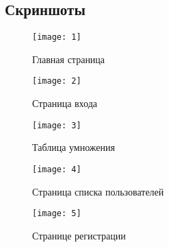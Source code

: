\documentclass[a4paper]{article}
\begin{document}
\pagebreak

\subsection{Скриншоты}

\begin{figure}[h]
\texttt{[image: 1]}
\caption{Главная страница}
\end{figure}

\begin{figure}[h]
\texttt{[image: 2]}
\caption{Страница входа}
\end{figure}

\begin{figure}[h]
\texttt{[image: 3]}
\caption{Таблица умножения}
\end{figure}

\begin{figure}[h]
\texttt{[image: 4]}
\caption{Страница списка пользователей}
\end{figure}

\begin{figure}[h]
\texttt{[image: 5]}
\caption{Странице регистрации}
\end{figure}
\end{document}

